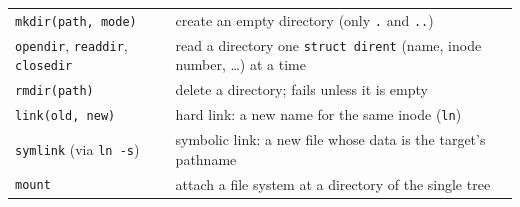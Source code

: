 \documentclass[11pt,a4paper]{article}
\begin{document}
\begin{center}
\begin{tabularx}{\textwidth}{@{}lX@{}}
  \texttt{mkdir(path, mode)} & create an empty directory (only \texttt{.} and \texttt{..}) \\
  \texttt{opendir}, \texttt{readdir}, \texttt{closedir} & read a directory one \texttt{struct dirent} (name, inode number, \ldots) at a time \\
  \texttt{rmdir(path)} & delete a directory; fails unless it is empty \\
  \texttt{link(old, new)} & hard link: a new name for the same inode (\texttt{ln}) \\
  \texttt{symlink} (via \texttt{ln -s}) & symbolic link: a new file whose data is the target's pathname \\
  \texttt{mount} & attach a file system at a directory of the single tree \\
  \bottomrule
\end{tabularx}
\end{center}
\end{document}
